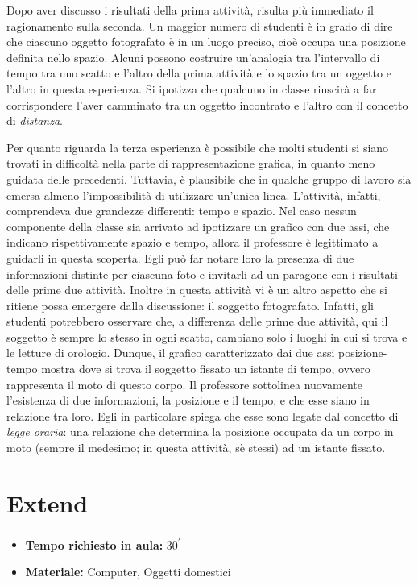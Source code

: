\documentclass{report} \usepackage[T1]{fontenc} \usepackage[italian]{babel}
\begin{document}
Dopo aver discusso i risultati della prima attività, risulta più immediato il
ragionamento sulla seconda. Un maggior numero di studenti è in grado di dire
che ciascuno oggetto fotografato è in un luogo preciso, cioè occupa una
posizione definita nello spazio. Alcuni possono costruire un’analogia tra
l’intervallo di tempo tra uno scatto e l’altro della prima attività e lo spazio
tra un oggetto e l’altro in questa esperienza. Si ipotizza che qualcuno in
classe riuscirà a far corrispondere l’aver camminato tra un oggetto incontrato
e l’altro con il concetto di \emph{distanza}.

Per quanto riguarda la terza esperienza è possibile che molti studenti si siano
trovati in difficoltà nella parte di rappresentazione grafica, in quanto meno
guidata delle precedenti. Tuttavia, è plausibile che in qualche gruppo di
lavoro sia emersa almeno l’impossibilità di utilizzare un’unica linea.
L’attività, infatti, comprendeva due grandezze differenti: tempo e spazio.
Nel caso nessun componente della classe sia arrivato ad ipotizzare un grafico
con due assi, che indicano rispettivamente spazio e tempo, allora il professore
è legittimato a guidarli in questa scoperta. Egli può far notare loro la
presenza di due informazioni distinte per ciascuna foto e invitarli ad un
paragone con i risultati delle prime due attività.
Inoltre in questa attività vi è un altro aspetto che si ritiene possa emergere
dalla discussione: il soggetto fotografato. Infatti, gli studenti potrebbero
osservare che, a differenza delle prime due attività, qui il soggetto è sempre
lo stesso in ogni scatto, cambiano solo i luoghi in cui si trova e le letture
di orologio. Dunque, il grafico caratterizzato dai due assi posizione-tempo
mostra dove si trova il soggetto fissato un istante di tempo, ovvero rappresenta
il moto di questo corpo. Il professore sottolinea nuovamente l’esistenza di
due informazioni, la posizione e il tempo, e che esse siano in relazione tra
loro. Egli in particolare spiega che esse sono legate dal concetto
di \emph{legge oraria}:  una relazione che determina la posizione occupata da un
corpo  in moto (sempre il medesimo; in questa attività, sè stessi) ad un istante
fissato.

\section{Extend}
\begin{itemize}
\item \textbf{Tempo richiesto in aula:} 30\textsuperscript{$\prime$}
\item \textbf{Materiale:} Computer, Oggetti domestici
\end{itemize}
\end{document}
